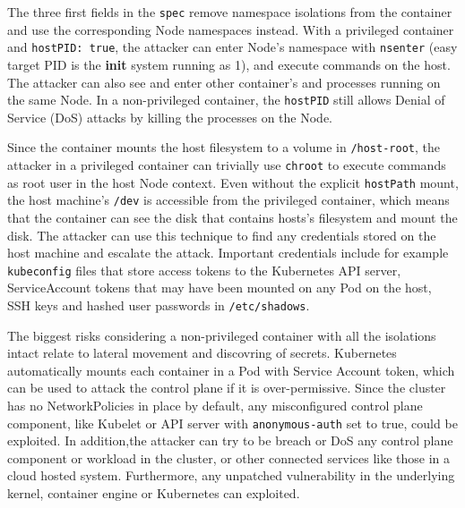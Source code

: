 \documentclass[english, 12pt, a4paper, sci, utf8, a-2b, online]{aaltothesis}
\begin{document}


The three first fields in the \texttt{spec} remove namespace isolations from the container and use the corresponding Node namespaces instead.
With a privileged container and \texttt{hostPID: true}, the attacker can enter Node's namespace with \texttt{nsenter} (easy target PID is the \textbf{init} system running as 1), and execute commands on the host.
The attacker can also see and enter other container's and processes running on the same Node.
In a non-privileged container, the \texttt{hostPID} still allows Denial of Service (DoS) attacks by killing the processes on the Node.

Since the container mounts the host filesystem to a volume in \texttt{/host-root}, the attacker in a privileged container can trivially use \texttt{chroot} to execute commands as root user in the host Node context.
Even without the explicit \texttt{hostPath} mount, the host machine's \texttt{/dev} is accessible from the privileged container, which means that the container can see the disk that contains hosts's filesystem and mount the disk.
The attacker can use this technique to find any credentials stored on the host machine and  escalate the attack.
Important credentials include for example \texttt{kubeconfig} files that store access tokens to the Kubernetes API server, ServiceAccount tokens that may have been mounted on any Pod on the host, SSH keys and hashed user passwords in \texttt{/etc/shadows}.

The biggest risks considering a non-privileged container with all the isolations intact relate to lateral movement and discovring of secrets.
Kubernetes automatically mounts each container in a Pod with Service Account token, which can be used to attack the control plane if it is over-permissive.
Since the cluster has no NetworkPolicies in place by default, any misconfigured control plane component, like Kubelet or API server with \texttt{anonymous-auth} set to true, could be exploited.
In addition,the attacker can try to be breach or DoS any control plane component or workload in the cluster, or other connected services like those in a cloud hosted system.
Furthermore, any unpatched vulnerability in the underlying kernel, container engine or Kubernetes can exploited.
\end{document}
